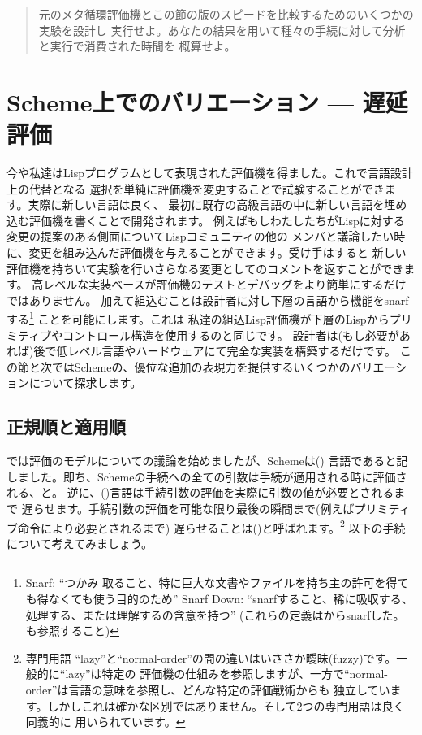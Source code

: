 \begin{quote}
元のメタ循環評価機とこの節の版のスピードを比較するためのいくつかの実験を設計し
実行せよ。あなたの結果を用いて種々の手続に対して分析と実行で消費された時間を
概算せよ。
\end{quote}

\section{Scheme上でのバリエーション --- 遅延評価}
\label{Sec. 4.2}
\label{Section 4.2}

今や私達はLispプログラムとして表現された評価機を得ました。これで言語設計上の代替となる
選択を単純に評価機を変更することで試験することができます。実際に新しい言語は良く、
最初に既存の高級言語の中に新しい言語を埋め込む評価機を書くことで開発されます。
例えばもしわたしたちがLispに対する変更の提案のある側面についてLispコミュニティの他の
メンバと議論したい時に、変更を組み込んだ評価機を与えることができます。受け手はすると
新しい評価機を持ちいて実験を行いさらなる変更としてのコメントを返すことができます。
高レベルな実装ベースが評価機のテストとデバッグをより簡単にするだけではありません。
加えて組込むことは設計者に対し下層の言語から機能をsnarfする\footnote{Snarf: ``つかみ
取ること、特に巨大な文書やファイルを持ち主の許可を得ても得なくても使う目的のため''
Snarf Down: ``snarfすること、稀に吸収する、処理する、または理解するの含意を持つ''
(これらの定義はからsnarfした。も参照すること)}
ことを可能にします。これは
私達の組込Lisp評価機が下層のLispからプリミティブやコントロール構造を使用するのと同じです。
設計者は(もし必要があれば)後で低レベル言語やハードウェアにて完全な実装を構築するだけです。
この節と次ではSchemeの、優位な追加の表現力を提供するいくつかのバリエーションについて探求します。



\subsection{正規順と適用順}
\label{Section 4.2.1}

では評価のモデルについての議論を始めましたが、Schemeは()
言語であると記しました。即ち、Schemeの手続への全ての引数は手続が適用される時に評価される、と。
逆に、()言語は手続引数の評価を実際に引数の値が必要とされるまで
遅らせます。手続引数の評価を可能な限り最後の瞬間まで(例えばプリミティブ命令により必要とされるまで)
遅らせることは()と呼ばれます。\footnote{専門用語
``lazy''と``normal-order''の間の違いはいささか曖昧(fuzzy)です。一般的に``lazy''は特定の
評価機の仕組みを参照しますが、一方で``normal-order''は言語の意味を参照し、どんな特定の評価戦術からも
独立しています。しかしこれは確かな区別ではありません。そして2つの専門用語は良く同義的に
用いられています。} 以下の手続について考えてみましょう。

